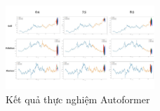 \begin{figure}[htbp]
\centerline{\includegraphics[width=0.5\textwidth]{img/autoformer_run.jpg}}
\caption{Kết quả thực nghiệm Autoformer}
\label{fig}
\end{figure}